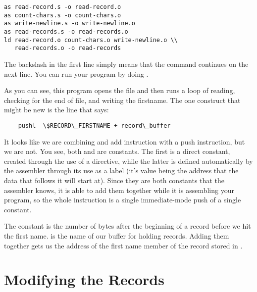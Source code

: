 \begin{simpletyping}
\begin{lstlisting}
as read-record.s -o read-record.o
as count-chars.s -o count-chars.o
as write-newline.s -o write-newline.o
as read-records.s -o read-records.o
ld read-record.o count-chars.o write-newline.o \\
   read-records.o -o read-records
\end{lstlisting}
\end{simpletyping}

The backslash in the first line simply means that the command continues on 
the next line.
You can run your program by doing .

As you can see, this program opens the file and then runs a loop of 
reading, checking for the end of file, and writing the firstname.  
The one construct that might be new is the line that says:

\begin{simpletyping}
\begin{lstlisting}
	pushl  \$RECORD\_FIRSTNAME + record\_buffer
\end{lstlisting}
\end{simpletyping}

It looks like we are combining and add instruction with a push instruction,
but we are not.  You see, both  and
 are constants.  The first is a direct
constant, created through the use of a  directive,
while the latter is defined automatically by the assembler through its use
as a label (it's value being the address that the data that follows it will
start at).  Since they are both constants that the assembler knows, it
is able to add them together while it is assembling your program, so the
whole instruction is a single immediate-mode push of a single constant.

The  constant is the number of bytes
after the beginning of a record before we hit the first name.
 is the name of our buffer for holding
records.  Adding them together gets us the address of the first name
member of the record stored in .

\section{Modifying the Records}

